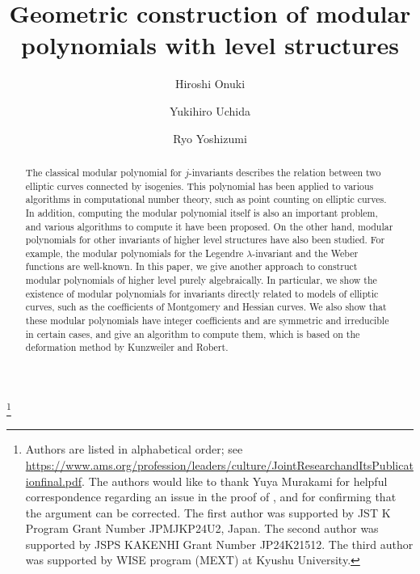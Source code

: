 \documentclass{amsart}
\theoremstyle{definition}
\theoremstyle{remark}
\numberwithin{equation}{section}
\begin{document}
\title[Geometric modular Polynomials with Level Structures]{Geometric construction of modular polynomials with level structures}


\author[H. Onuki]{Hiroshi Onuki}
\address{The University of Tokyo, Japan}

\author[Y. Uchida]{Yukihiro Uchida}
\address{Tokyo Metropolitan University, Japan}

\author[R. Yoshizumi]{Ryo Yoshizumi}
\address{Kyushu University, Japan}



\date{}

\dedicatory{}
\thanks{
    Authors are listed in alphabetical order;
    see \url{https://www.ams.org/profession/leaders/culture/JointResearchandItsPublicationfinal.pdf}.
    The authors would like to thank Yuya Murakami for
    helpful correspondence regarding an issue in the proof of \cite[Proposition 2.12]{Murakami2020},
    and for confirming that the argument can be corrected.
    The first author was supported by JST K Program Grant Number JPMJKP24U2, Japan.
    The second author was supported by JSPS KAKENHI Grant Number JP24K21512.
    The third author was supported by WISE program (MEXT) at Kyushu University.
}

\begin{abstract}
The classical modular polynomial for $j$-invariants
describes the relation between two elliptic curves connected by isogenies.
This polynomial has been applied to various algorithms in computational number theory,
such as point counting on elliptic curves.
In addition, computing the modular polynomial itself is also an important problem,
and various algorithms to compute it have been proposed.
On the other hand,
modular polynomials for other invariants of higher level structures
have also been studied.
For example, the modular polynomials for the Legendre $\lambda$-invariant
and the Weber functions are well-known.
In this paper, we give another approach to construct modular polynomials of higher level
purely algebraically.
In particular, we show the existence of modular polynomials
for invariants directly related to models of elliptic curves,
such as the coefficients of Montgomery and Hessian curves.
We also show that these modular polynomials have integer coefficients
and are symmetric and irreducible in certain cases,
and give an algorithm to compute them, which is based on the deformation method
by Kunzweiler and Robert.
\end{abstract}
\end{document}
